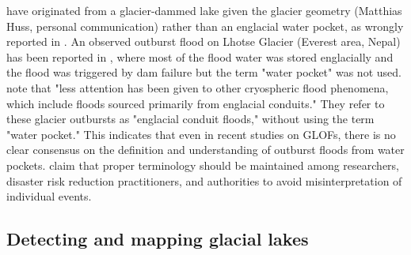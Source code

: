 have originated from a glacier-dammed lake given the glacier geometry (Matthias Huss, personal communication) rather than an englacial water pocket, as wrongly reported in \cite{Lutzow&al2023}. An observed outburst flood on Lhotse Glacier (Everest area, Nepal) has been reported in \cite{Rounce&al2017}, where most of the flood water was stored englacially and the flood was triggered by dam failure but the term "water pocket" was not used. \cite{Byers&al2022} note that "less attention has been given to other cryospheric flood phenomena, which include floods sourced primarily from englacial conduits." They refer to these glacier outbursts as "englacial conduit floods," without using the term "water pocket." This indicates that even in recent studies on GLOFs, there is no clear consensus on the definition and understanding of outburst floods from water pockets. \cite{Emmer&al2022} claim that proper terminology should be maintained among researchers, disaster risk reduction practitioners, and authorities to avoid misinterpretation of individual events. 


\subsection{Detecting and mapping glacial lakes}



